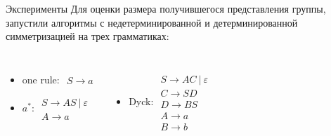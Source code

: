 \documentclass[xcolor=table]{beamer}
\begin{document}
\begin{frame}[fragile]{Эксперименты}
Для оценки размера получившегося представления группы, запустили алгоритмы с недетерминированной и детерминированной симметризацией на трех грамматиках:
\begin{columns}[onlytextwidth,T]
        \begin{itemize}
    \item one rule: 
    $\begin{array}{lCr}
        \nonumber S \to a
    \end{array}$
    \newline
    \newline
    \item $a^*$:
    $\begin{array}{lCr}
        S \to AS ~|~ \varepsilon \nonumber \\
        A \to a \nonumber
    \end{array}$
    \end{itemize}
    
        \begin{itemize}
            \item Dyck:
    $\begin{array}{lCr}
        S \to AC ~|~ \varepsilon \nonumber \\
        C \to SD \\
        D \to BS \nonumber \\
        A \to a \nonumber \\
        B \to b \nonumber
    \end{array}$
        \end{itemize}
    \end{columns}

\end{frame}
\end{document}
